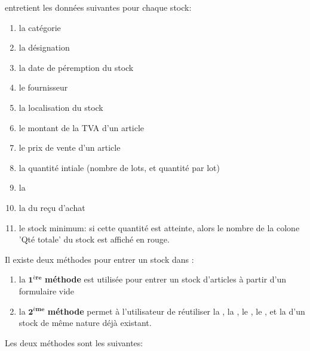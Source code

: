 


\yeren entretient les donn\'ees suivantes pour chaque stock:
\begin{enumerate}[1)]
	\item la cat\'egorie \obligatoire
	\item la d\'esignation \obligatoire
	\item la date de p\'eremption du stock 
	\item le fournisseur 
	\item la localisation du stock
	\item le montant de la TVA d'un article 
	\item le prix de vente d'un article \obligatoire
	\item la quantit\'e intiale (nombre de lots, et quantit\'e par lot) \obligatoire
	\item la 
	\item la  du re\c{c}u d'achat
	\item le stock minimum: si cette quantit\'e
		est atteinte, alors le nombre de la colone 'Qt\'e totale'
		du stock est affich\'e en rouge.\\
\end{enumerate}

Il existe deux m\'ethodes pour entrer un stock dans \yeren:
\begin{enumerate}[1)]
	\item la $\mathbf{1^{\textbf{\`ere}}}$ \textbf{m\'ethode}
	est utilis\'ee pour entrer un stock d'articles \`a partir
	d'un formulaire vide
	
	\item la $\mathbf{2^{\textbf{\`eme}}}$ \textbf{m\'ethode}
	permet \`a l'utilisateur de r\'eutiliser la
	, la ,
	le , le ,
	et la  d'un stock de m\^eme nature
	d\'ej\`a existant.\\
\end{enumerate}

Les deux m\'ethodes sont les suivantes:

